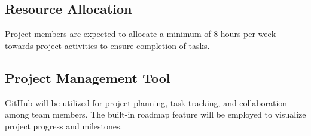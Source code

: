 \subsection{Resource Allocation}

Project members are expected to allocate a minimum of 8 hours per week towards project activities to ensure completion of tasks.

\subsection{Project Management Tool}

GitHub will be utilized for project planning, task tracking, and collaboration among team members. The built-in roadmap feature will be employed to visualize project progress and milestones.








  
